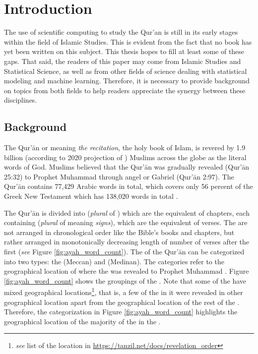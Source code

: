 \chapter{Introduction}
\label{ch:introduction}
The use of scientific computing to study the Qur'an is still in its early stages within the field of Islamic Studies. This is evident from the fact that no book has yet been written on this subject. This thesis hopes to fill at least some of these gaps. That said, the readers of this paper may come from Islamic Studies and Statistical Science, as well as from other fields of science dealing with statistical modeling and machine learning. Therefore, it is necessary to provide background on topics from both fields to help readers appreciate the synergy between these disciplines.

\section{Background}
The Qur'\=an or   meaning \textit{the recitation}, the holy book of Islam, is revered by 1.9 billion (according to 2020 projection of ) Muslims across the globe as the literal words of God. Muslims believed that the Qur'\=an was gradually revealed (Qur'\=an 25:32) to Prophet Muhammad  through angel   or Gabriel (Qur'\=an 2:97). The Qur'\=an contains 77,429 Arabic words in total, which covers only 56 percent of the Greek New Testament which has 138,020 words in total \cite[p.~11]{sinai2017}. 

The Qur'\=an is divided into   (\textit{plural} of  ) which are the equivalent of chapters, each containing   (\textit{plural} of   meaning \textit{signs}), which are the equivalent of verses. The   are not arranged in chronological order like the Bible's books and chapters, but rather arranged in monotonically decreasing length of number of verses after the first   (\textit{see} Figure \ref{fig:ayah_word_count}). The   of the Qur'\=an can be categorized into two types: the   (Meccan) and   (Medinan). The categories refer to the geographical location of where the   was revealed to Prophet Muhammad . Figure \ref{fig:ayah_word_count} shows the groupings of the  . Note that some of the   have mixed geographical locations\footnote{\textit{see} list of the location in \url{https://tanzil.net/docs/revelation_order}}, that is, a few of the   in it were revealed in other geographical location apart from the geographical location of the rest of the  . Therefore, the categorization in Figure \ref{fig:ayah_word_count} highlights the geographical location of the majority of the   in the  .

